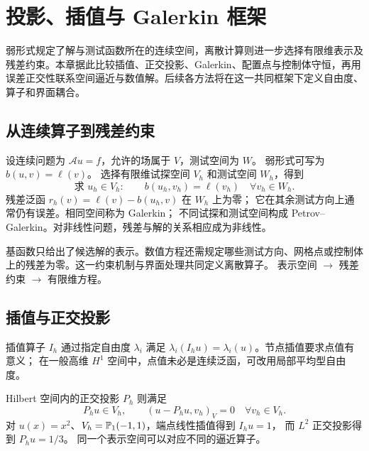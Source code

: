 \chapter{投影、插值与 Galerkin 框架}\label{ch:6}
\begin{chaptersummary}
弱形式规定了解与测试函数所在的连续空间，离散计算则进一步选择有限维表示及残差约束。本章据此比较插值、正交投影、Galerkin、配置点与控制体守恒，再用误差正交性联系空间逼近与数值解。后续各方法将在这一共同框架下定义自由度、算子和界面耦合。
\end{chaptersummary}

\section{从连续算子到残差约束}
设连续问题为 $\mathcal A u=f$，允许的场属于 $V$，测试空间为 $W$。
弱形式可写为 $b(u,v)=\ell(v)$。
选择有限维试探空间 $V_h$ 和测试空间 $W_h$，得到
\begin{equation}\label{eq:galerkin-general}
\text{求 }u_h\in V_h:\qquad b(u_h,v_h)=\ell(v_h)
\quad\forall v_h\in W_h.
\end{equation}
残差泛函 $r_h(v)=\ell(v)-b(u_h,v)$ 在 $W_h$ 上为零；
它在其余测试方向上通常仍有误差。相同空间称为 Galerkin；
不同试探和测试空间构成 Petrov--Galerkin。对非线性问题，残差与解的关系相应成为非线性。

{基函数只给出了候选解的表示。数值方程还需规定哪些测试方向、网格点或控制体上的残差为零。这一约束机制与界面处理共同定义离散算子。}
{表示空间 $\longrightarrow$ 残差约束 $\longrightarrow$ 有限维方程。}

\section{插值与正交投影}
插值算子 $I_h$ 通过指定自由度 $\lambda_i$ 满足
$\lambda_i(I_hu)=\lambda_i(u)$。节点插值要求点值有意义；
在一般高维 $H^1$ 空间中，点值未必是连续泛函，可改用局部平均型自由度。

Hilbert 空间内的正交投影 $P_h$ 则满足
\[
P_hu\in V_h,\qquad (u-P_hu,v_h)_V=0\quad\forall v_h\in V_h.
\]
对 $u(x)=x^2$、$V_h=\mathbb P_1(-1,1)$，端点线性插值得到 $I_hu=1$，
而 $L^2$ 正交投影得到 $P_hu=1/3$。
同一个表示空间可以对应不同的逼近算子。

